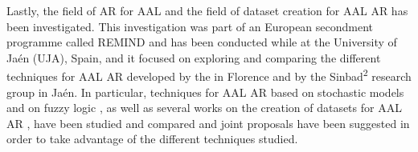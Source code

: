   Lastly, the field of \ac{AR} \cite{chen2011activity,patterson2003inferring,turaga2008machine} for \ac{AAL} \cite{cook2009ambient} and the field of dataset creation for \ac{AAL} \ac{AR} has been investigated. This investigation was part of an European secondment programme called REMIND and has been conducted while at the University of Jaén (\ac{UJA}), Spain, and it focused on exploring and comparing the different techniques for \ac{AAL} \ac{AR} developed by the  \cite{stlab} in Florence and by the Sinbad\textsuperscript{2} research group \cite{sinbad2} in Jaén. In particular, techniques for \ac{AAL} \ac{AR} based on stochastic models \cite{biagi2016stochastic,carnevali2015continuous} and on fuzzy logic \cite{medina2015activity}, as well as several works on the creation of datasets for \ac{AAL} \ac{AR} \cite{patara2015recommendations,quesada2015generation}, have been studied and compared and joint proposals have been suggested in order to take advantage of the different techniques studied.
  
\newpage
